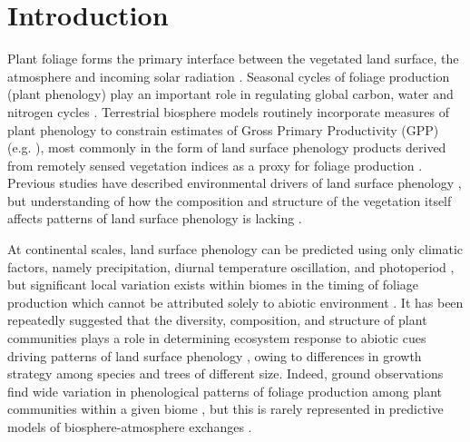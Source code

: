 \documentclass[11pt,a4paper]{article}
\begin{document}
\newpage{}

\section{Introduction}

Plant foliage forms the primary interface between the vegetated land surface, the atmosphere and incoming solar radiation \citep{Gu2003, Penuelas2009}. Seasonal cycles of foliage production (plant phenology) play an important role in regulating global carbon, water and nitrogen cycles \citep{Richardson2013}. Terrestrial biosphere models routinely incorporate measures of plant phenology to constrain estimates of Gross Primary Productivity (GPP) (e.g. \citealt{Bloom2016}), most commonly in the form of land surface phenology products derived from remotely sensed vegetation indices as a proxy for foliage production \citep{Helman2018}. Previous studies have described environmental drivers of land surface phenology \citep{Adole2019, Guan2014}, but understanding of how the composition and structure of the vegetation itself affects patterns of land surface phenology is lacking \citep{Whitley2017}. 

At continental scales, land surface phenology can be predicted using only climatic factors, namely precipitation, diurnal temperature oscillation, and photoperiod \citep{Adole2018a, Adole2019, Guan2014}, but significant local variation exists within biomes in the timing of foliage production which cannot be attributed solely to abiotic environment \citep{Stockli2011}. It has been repeatedly suggested that the diversity, composition, and structure of plant communities plays a role in determining ecosystem response to abiotic cues driving patterns of land surface phenology \citep{Adole2018b, Jeganathan2014, Fuller1999}, owing to differences in growth strategy among species and trees of different size. Indeed, ground observations find wide variation in phenological patterns of foliage production among plant communities within a given biome \citep{}, but this is rarely represented in predictive models of biosphere-atmosphere exchanges \citep{Scheiter2013, Pavlick2013}.
\end{document}
